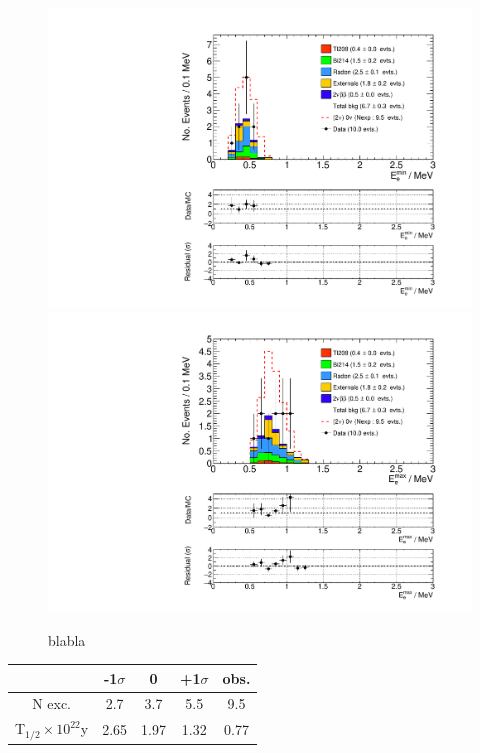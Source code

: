 \documentclass[main.tex]{subfiles}
\begin{document}
\begin{figure} [h!]
\begin{center}
\includegraphics[scale=0.5]{pictures/FinalResults/bb0nu2/150precut/Eemin_bb0nu2.pdf}
\includegraphics[scale=0.5]{pictures/FinalResults/bb0nu2/150precut/Eemax_bb0nu2.pdf}
\end{center}
\caption{blabla}
\label{plot:SEeAndEg250bb0nu2Precut}
\end{figure}



\begin{table}
\centering
\begin{tabular}{c|c|c|c||c}
                                                & -1$\sigma$ & 0        & +1$\sigma$ & obs.     \\[0.2cm]
\hline
N exc.                                          & 2.7        & 3.7      & 5.5        & 9.5      \\[0.2cm]
T$_{\text{1/2}} \times \text{10}^{\text{22}}$y  & 2.65       & 1.97     & 1.32       & 0.77      \\[0.2cm]
\hline
\end{tabular}
\end{table}
\end{document}
